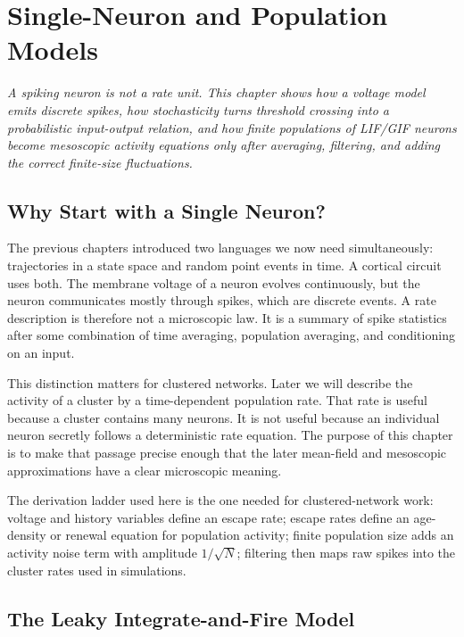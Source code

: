 \chapter{Single-Neuron and Population Models}
\label{ch:single-neuron-population-models}

\textit{A spiking neuron is not a rate unit. This chapter shows how a voltage
model emits discrete spikes, how stochasticity turns threshold crossing into a
probabilistic input-output relation, and how finite populations of LIF/GIF
neurons become mesoscopic activity equations only after averaging, filtering,
and adding the correct finite-size fluctuations.}

\section{Why Start with a Single Neuron?}
\label{sec:why-single-neuron}

The previous chapters introduced two languages we now need simultaneously:
trajectories in a state space and random point events in time. A cortical circuit
uses both. The membrane voltage of a neuron evolves continuously, but the
neuron communicates mostly through spikes, which are discrete events. A rate
description is therefore not a microscopic law. It is a summary of spike
statistics after some combination of time averaging, population averaging, and
conditioning on an input.

This distinction matters for clustered networks. Later we will describe the
activity of a cluster by a time-dependent population rate. That rate is useful
because a cluster contains many neurons. It is not useful because an individual
neuron secretly follows a deterministic rate equation. The purpose of this
chapter is to make that passage precise enough that the later mean-field and
mesoscopic approximations have a clear microscopic meaning.

The derivation ladder used here is the one needed for clustered-network work:
voltage and history variables define an escape rate; escape rates define an
age-density or renewal equation for population activity; finite population size
adds an activity noise term with amplitude \(1/\sqrt{N}\); filtering then maps
raw spikes into the cluster rates used in simulations.

\section{The Leaky Integrate-and-Fire Model}
\label{sec:lif}

